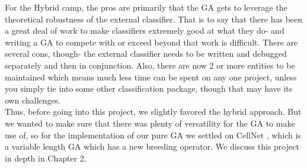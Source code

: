 For the Hybrid camp, the pros are primarily that the GA gets to leverage the theoretical robustness of the external classifier.  That is to say that there has been a great deal of work to make classifiers extremely good at what they do- and writing a GA to compete with or exceed beyond that work is difficult.  There are several cons, though- the external classifier needs to be written and debugged separately and then in conjunction.  Also, there are now 2 or more entities to be maintained which means much less time can be spent on any one project, unless you simply tie into some other classification package, though that may have its own challenges.\\
Thus, before going into this project, we slightly favored the hybrid approach.  But we wanted to make sure that there was plenty of versatility for the GA to make use of, so for the implementation of our pure GA we settled on CellNet \citep{kharma_project_2004}, which is a variable length GA which has a new breeding operator.  We discuss this project in depth in Chapter 2.  

